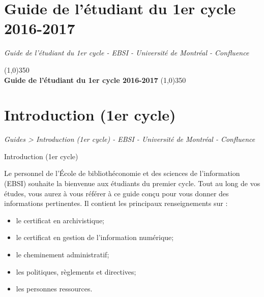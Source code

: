 \documentclass [12 pt]{article}
\begin{document}
        
        
    
        \newpage
        \section {
        Guide de l'étudiant du 1er cycle 2016-2017
        }
        
        
        
        \textit{
        Guide de l'étudiant du 1er cycle - EBSI - Université de Montréal -
            Confluence
        }
    
        
        \begin{titlepage}
        \begin{center}
        \line(1,0){350}\\
        \huge{\bfseries 
        Guide de l'étudiant du 1er cycle 2016-2017
        }
        \line(1,0){350}
        \vskip10cm
        
        
        \end{center}
        \end{titlepage}
    
         
    
    
        \newpage
        \section {
        Introduction (1er cycle)
        }
        
        
        
        \textit{
        Guides > Introduction (1er cycle) - EBSI - Université de Montréal -
            Confluence
        }
    
        Introduction (1er cycle)
        
            Le personnel de l'École de bibliothéconomie et des sciences de l'information (EBSI)
                souhaite la bienvenue aux étudiants du premier cycle. Tout au long de vos études,
                vous aurez à vous référer à ce guide conçu pour vous donner des informations
                pertinentes. Il contient les principaux renseignements sur :
            
        \begin{itemize}
        
                
        \item le certificat en archivistique;
                
        \item le certificat en gestion de l'information numérique;
                
        \item le cheminement administratif;
                
        \item les politiques, règlements et directives;
                
        \item les personnes ressources.
            
        \end{itemize}
    
\end{document}
